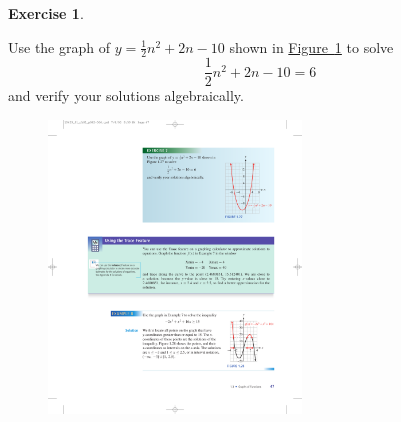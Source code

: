 \documentclass[10pt,]{book}
\theoremstyle{plain}
\theoremstyle{definition}
\theoremstyle{definition}
\theoremstyle{definition}
\theoremstyle{definition}
\theoremstyle{definition}
\newtheorem{exercise}[theorem]{Exercise}
\numberwithin{equation}{section}
\begin{document}
\begin{exercise}\label{exercise-graph-to-solve-quadratic}

    Use the graph of \(y = \frac{1}{2}n^2 + 2n − 10\) shown in \hyperref[fig-graph-to-solve-quadratic]{Figure~\ref{fig-graph-to-solve-quadratic}} to solve
    \begin{equation*}\frac{1}{2}n^2 + 2n − 10 = 6\end{equation*}
    and verify your solutions algebraically.
\leavevmode%
\begin{figure}
\centering
\includegraphics[width=0.60\textwidth,]{images/fig-graph-to-solve-quadratic.pdf}\caption{\label{fig-graph-to-solve-quadratic}}
\end{figure}
\end{exercise}
\end{document}
